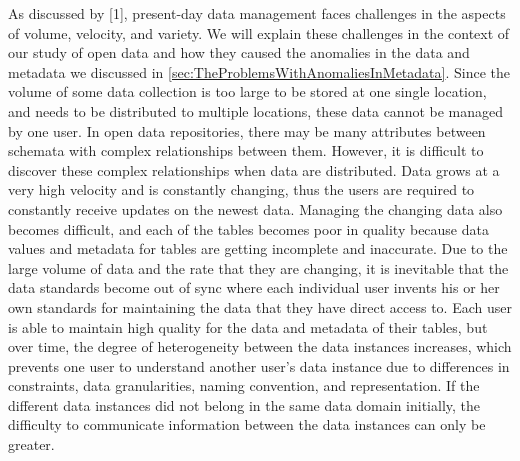 As discussed by \cite{10.1145/2845915}[1], present-day data management faces challenges in the aspects of volume, velocity, and variety. We will explain these challenges in the context of our study of open data and how they caused the anomalies in the data and metadata we discussed in \autoref{sec:TheProblemsWithAnomaliesInMetadata}.
Since the volume of some data collection is too large to be stored at one single location, and needs to be distributed to multiple locations, these data cannot be managed by one user. In open data repositories, there may be many attributes between schemata with complex relationships between them. However, it is difficult to discover these complex relationships when data are distributed.
Data grows at a very high velocity and is constantly changing, thus the users are required to constantly receive updates on the newest data. Managing the changing data also becomes difficult, and each of the tables becomes poor in quality because data values and metadata for tables are getting incomplete and inaccurate.
Due to the large volume of data and the rate that they are changing, it is inevitable that the data standards become out of sync where each individual user invents his or her own standards for maintaining the data that they have direct access to. Each user is able to maintain high quality for the data and metadata of their tables, but over time, the degree of heterogeneity between the data instances increases, which prevents one user to understand another user’s data instance due to differences in constraints, data granularities, naming convention, and representation. If the different data instances did not belong in the same data domain initially, the difficulty to communicate information between the data instances can only be greater.

